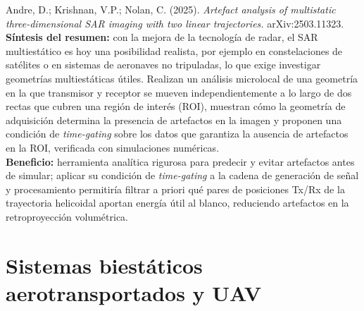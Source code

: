 \documentclass[11pt,a4paper]{report}
\begin{document}
\begin{enumerate}[label=\textbf{[C\arabic*]}, leftmargin=2.2cm, itemsep=10pt]
\item Andre, D.; Krishnan, V.P.; Nolan, C. (2025). \textit{Artefact analysis
of multistatic three-dimensional SAR imaging with two linear
trajectories.} arXiv:2503.11323. \cite{andre2025}\\
\textbf{Síntesis del resumen:} con la mejora de la tecnología de radar, el
SAR multiestático es hoy una posibilidad realista, por ejemplo en
constelaciones de satélites o en sistemas de aeronaves no tripuladas, lo que
exige investigar geometrías multiestáticas útiles. Realizan un análisis
microlocal de una geometría en la que transmisor y receptor se mueven
independientemente a lo largo de dos rectas que cubren una región de
interés (ROI), muestran cómo la geometría de adquisición determina la
presencia de artefactos en la imagen y proponen una condición de
\emph{time-gating} sobre los datos que garantiza la ausencia de artefactos
en la ROI, verificada con simulaciones numéricas.\\
\textbf{Beneficio:} herramienta analítica rigurosa para predecir y evitar
artefactos antes de simular; aplicar su condición de \emph{time-gating} a la
cadena de generación de señal y procesamiento permitiría filtrar a priori
qué pares de posiciones Tx/Rx de la trayectoria helicoidal aportan energía
útil al blanco, reduciendo artefactos en la retroproyección volumétrica.

\end{enumerate}

\section{Sistemas biestáticos aerotransportados y UAV}
\label{sec:uav}
\end{document}
